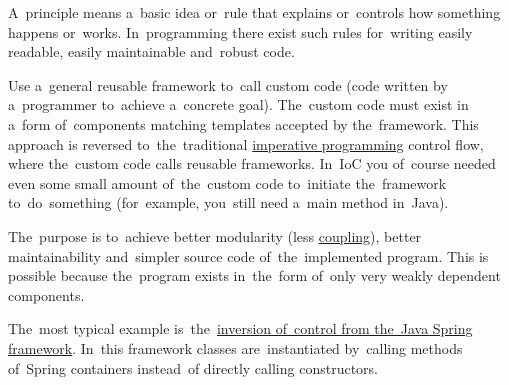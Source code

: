 A~principle means a~basic idea or~rule that explains or~controls how something happens or~works. In~programming there exist such rules for~writing easily readable, easily maintainable and~robust code.


\label{inversionofcontrol}
Use a~general reusable framework to~call custom code (code written by a~programmer to~achieve a~concrete goal). The~custom code must exist in a~form of~components matching templates accepted by the~framework. This approach is reversed to~the~traditional \hyperref[imperativeprogramming]{imperative programming} control flow, where the~custom code calls reusable frameworks. In~IoC you of~course needed even some small amount of~the~custom code to~initiate the~framework to~do~something (for~example, you~still need a~main method in~Java).

The~purpose is to~achieve better modularity (less \hyperref[loosetightcoupling]{coupling}), better maintainability and~simpler source code of~the~implemented program. This is possible because the~program exists in~the~form of~only very weakly dependent components.

The~most typical example is~the~\hyperref[springinversionofcontrol]{inversion of~control from the~Java Spring framework}. In~this framework classes are~instantiated by~calling methods of~Spring containers instead~of directly calling constructors.

